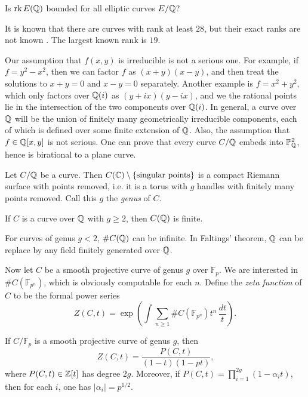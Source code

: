 \documentclass{article}
\begin{document}
\begin{question}
Is $\operatorname{rk} E(\mathbb{Q})$ bounded for all elliptic curves 
$E/\mathbb{Q}$?
\end{question}

It is known that there are curves with rank at least $28$, but their exact 
ranks are not known \cite{du}. The largest known rank is $19$. 

Our assumption that $f(x,y)$ is irreducible is not a serious one. For example, 
if $f=y^2-x^2$, then we can factor $f$ as $(x+y)(x-y)$, and then treat the 
solutions to $x+y=0$ and $x-y=0$ separately. Another example is $f=x^2+y^2$, 
which only factors over $\mathbb{Q}(i)$ as $(y+i x)(y-i x)$, and we the rational 
points lie in the intersection of the two components over $\mathbb{Q}(i)$. In general, 
a curve over $\mathbb{Q}$ will be the union of finitely many geometrically irreducible 
components, each of which is defined over some finite extension of $\mathbb{Q}$. Also, 
the assumption that $f\in \mathbb{Q}[x,y]$ is not serious. One can prove that every 
curve $C/\mathbb{Q}$ embeds into $\mathbb{P}^2_{\mathbb{Q}}$, hence is birational to a plane curve. 

Let $C/\mathbb{Q}$ be a curve. Then 
$C(\mathbb{C})\setminus \{\text{singular points}\}$ is a compact Riemann 
surface with points removed, i.e. it is a torus with $g$ handles with finitely 
many points removed. Call this $g$ the \emph{genus} of $C$. 

\begin{theorem}
If $C$ is a curve over $\mathbb{Q}$ with $g\geqslant 2$, then $C(\mathbb{Q})$ 
is finite. 
\end{theorem}

For curves of genus $g<2$, $\# C(\mathbb{Q})$ can be infinite. In Faltings' 
theorem, $\mathbb{Q}$ can be replace by any field finitely generated over 
$\mathbb{Q}$. 

Now let $C$ be a smooth projective curve of genus $g$ over $\mathbb{F}_p$. 
We are interested in $\#C(\mathbb{F}_{p^n})$, which is obviously computable 
for each $n$. Define the \emph{zeta function} of $C$ to be the formal power 
series 
\[
  Z(C,t) = \exp\left( \int\sum_{n\geqslant 1} \# C(\mathbb{F}_{p^n}) t^n\, \frac{dt}{t}\right) \text{.}
\]

\begin{theorem}[Weil]
If $C/\mathbb{F}_p$ is a smooth projective curve of genus $g$, then 
\[
  Z(C,t) = \frac{P(C,t)}{(1-t)(1-p t)} \text{,}
\]
where $P(C,t)\in \mathbb{Z}[t]$ has degree $2 g$. Moreover, if 
$P(C,t) = \prod_{i=1}^{2 g} (1-\alpha_i t)$, then for each $i$, one has 
$|\alpha_i|=p^{1/2}$. 
\end{theorem}
\end{document}
